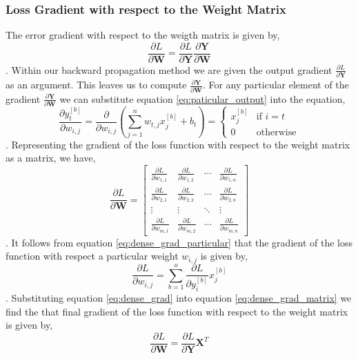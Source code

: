 \documentclass[11pt]{article}
\theoremstyle{definition}
\begin{document}
\subsubsection{Loss Gradient with respect to the Weight Matrix}
The error gradient with 
respect to the weigth matrix is given by,
\begin{equation}
    \frac{\partial L}{\partial \mathbf{W}} = \frac{\partial L}{\partial \mathbf{Y}} \frac{\partial \mathbf{Y}}{\partial \mathbf{W}}
\end{equation}
. Within our backward propagation method we are given the output gradient 
$\frac{\partial L}{\partial \mathbf{Y}}$ as an argument. This leaves us to compute 
$\frac{\partial \mathbf{Y}}{\partial \mathbf{W}}$. For any particular element of the 
gradient $\frac{\partial \mathbf{Y}}{\partial \mathbf{W}}$ we can substitute equation 
\ref{eq:paticular_output} into the equation,
\begin{equation}
    \frac{\partial y^{[b]}_t}{\partial w_{i,j}} = \frac{\partial}{\partial w_{i,j}} \left( \sum_{j=1}^{n} w_{t,j} x_j^{[b]} + b_t \right) = 
    \begin{cases}
        x_j^{[b]} & \text{if } i = t \\
        0 & \text{otherwise}
    \end{cases}
    \label{eq:dense_grad_particular}
\end{equation}
. Representing the gradient of the loss function with respect to the weight matrix as a
matrix, we have,
\begin{equation}
    \frac{\partial L}{\partial \mathbf{W}} = 
    \begin{bmatrix}
        \frac{\partial L}{\partial w_{1,1}} & \frac{\partial L}{\partial w_{1,2}} & \cdots & \frac{\partial L}{\partial w_{1,n}} \\
        \frac{\partial L}{\partial w_{2,1}} & \frac{\partial L}{\partial w_{2,2}} & \cdots & \frac{\partial L}{\partial w_{2,n}} \\
        \vdots & \vdots & \ddots & \vdots \\
        \frac{\partial L}{\partial w_{m,1}} & \frac{\partial L}{\partial w_{m,2}} & \cdots & \frac{\partial L}{\partial w_{m,n}}
    \end{bmatrix}
    \label{eq:dense_grad_matrix}
\end{equation}
. It follows from equation \ref{eq:dense_grad_particular} that the gradient of the loss 
function with respect a particular weight $w_{i,j}$ is given by,
\begin{equation}
    \frac{\partial L}{\partial w_{i,j}} = \sum_{b=1}^{o} \frac{\partial L}{\partial y^{[b]}_i} x_j^{[b]}
    \label{eq:dense_grad}
\end{equation}
. Substituting equation \ref{eq:dense_grad} into equation \ref{eq:dense_grad_matrix} we
find the that final gradient of the loss function with respect to the weight matrix is 
given by,
\begin{equation}
    \frac{\partial L}{\partial \mathbf{W}} = \frac{\partial L}{\partial \mathbf{Y}} \mathbf{X}^T
\end{equation}
\end{document}
